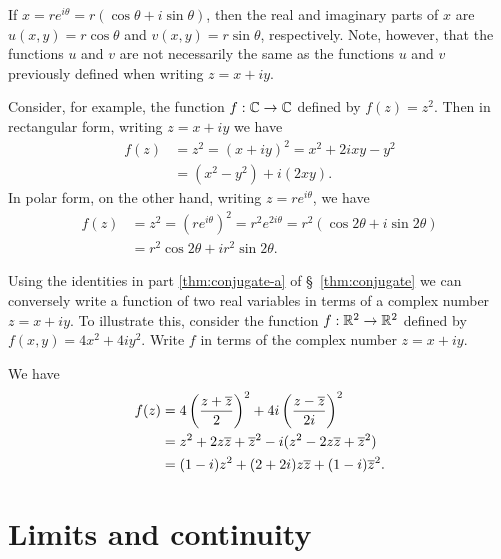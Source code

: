 \begin{example}
    If \(x = re^{i\theta} = r(\cos\theta + i\sin\theta)\), then the real and imaginary parts of \(x\) are \(u(x, y) = r\cos\theta\) and \(v(x, y) = r\sin\theta\), respectively. Note, however, that the functions \(u\) and \(v\) are not necessarily the same as the functions \(u\) and \(v\) previously defined when writing \(z = x+ iy\).

    Consider, for example, the function \(f : \mathbb{C} \to \mathbb{C}\) defined by \(f(z) = z^2\). Then in rectangular form, writing \(z = x + iy\) we have
    \begin{align*}
        f(z) & = z^2 = (x + iy)^2 = x^2 + 2ixy - y^2\\
        & = (x^2 - y^2) + i(2xy).
    \end{align*}
    In polar form, on the other hand, writing \(z = re^{i\theta}\), we have
    \begin{align*}
        f(z) & = z^2  = (re^{i\theta})^2 = r^2e^{2i\theta} = r^2(\cos 2\theta + i\sin 2\theta)\\
        & = r^2\cos 2\theta + ir^2\sin 2\theta.
    \end{align*}
\end{example}

\begin{example}
    Using the identities in part \ref{thm:conjugate-a} of \S~\ref{thm:conjugate} we can conversely write a function of two real variables in terms of a complex number \(z = x + iy\). To illustrate this, consider the function \(f : \mathbb{R}^2 \to \mathbb{R}^2\) defined by \(f(x, y) = 4x^2 + 4iy^2\). Write \(f\) in terms of the complex number \(z = x + iy\).

    \begin{solution}
        We have
        \begin{align*}
            f(z) & = 4\left(\frac{z + \overline{z}}{2}\right)^2 + 4i\left(\frac{z - \overline{z}}{2i}\right)^2\\
            & = z^2 + 2z\overline{z} + \overline{z}^2 - i(z^2 - 2z\overline{z} + \overline{z}^2)\\
            & = (1 - i)z^2 + (2 + 2i)z\overline{z} + (1 - i)\overline{z}^2.
        \end{align*}
    \end{solution}
\end{example}

\section{Limits and continuity}


